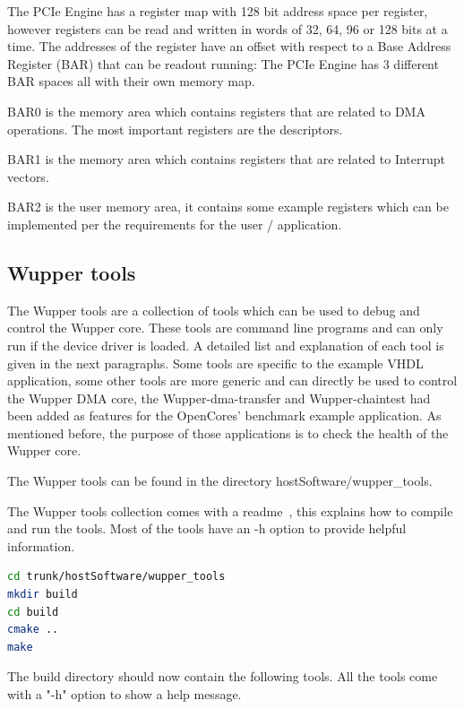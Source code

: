 The PCIe Engine has a register map with 128 bit address space per register, however registers can be read and written in words of 32, 64, 96 or 128 bits at a time. The addresses of the register have an offset with respect to a Base Address Register (BAR) that can be readout running: The PCIe Engine has 3 different BAR spaces all with their own memory map. 

BAR0 is the memory area which contains registers that are related to DMA operations. The most important registers are the descriptors.

BAR1 is the memory area which contains registers that are related to Interrupt vectors.

BAR2 is the user memory area, it contains some example registers which can be implemented per the requirements for the user / application.

\subsection{Wupper tools}
The Wupper tools are a collection of tools which can be used to debug and control the Wupper core. These tools are command line programs and can only run if the device driver is loaded. A detailed list and explanation of each tool is given in the next paragraphs. Some tools are specific to the example VHDL application, some other tools are more generic and can directly be used to control the Wupper DMA core, the Wupper-dma-transfer and Wupper-chaintest had been added as features for the OpenCores' benchmark example application. As mentioned before, the purpose of those applications is to check the health of the Wupper core. 

The Wupper tools can be found in the directory hostSoftware/wupper\_tools.

The Wupper tools collection comes with a readme~\cite{wupperreadme}, this explains how to compile and run the tools. Most of the tools have an -h option to provide helpful information. 

\begin{lstlisting}[language=BASH, frame=single, caption=Building Wupper Tools]
cd trunk/hostSoftware/wupper_tools
mkdir build
cd build
cmake ..
make
\end{lstlisting}
The build directory should now contain the following tools. All the tools come with a "-h" option to show a help message.

